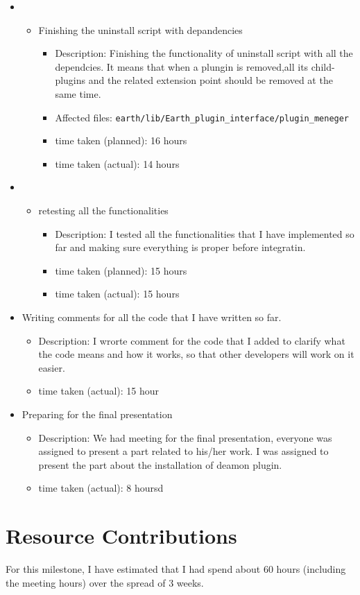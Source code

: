 \documentclass{article}
\begin{document}
\begin{itemize}
	\item  
	     \begin{itemize}
	        \item Finishing the uninstall script with depandencies
	           \begin{itemize}
					\item Description: Finishing the functionality of uninstall script with all the dependcies. It means that when a plungin is     removed,all its child-plugins and the related extension point should be removed at the same time.
				
					\item Affected files: \texttt{earth/lib/Earth\_plugin\_interface/plugin\_meneger}
					\item  time taken (planned): 16 hours
					\item  time taken (actual): 14 hours
				\end{itemize}
			
	     \end{itemize}
	\item 
	     \begin{itemize}
	         \item retesting all the functionalities
	            \begin{itemize}
	              \item Description: I tested all the functionalities that I have implemented so far and making sure everything is proper before integratin. 
					\item time taken (planned): 15 hours
					\item time taken (actual): 15 hours
				 \end{itemize}
	     \end{itemize}
	\item Writing comments for all the code that I have written so far.
	     \begin{itemize}
	         \item Description: I wrorte comment for the code that I added to clarify what the code means and how it works, so that other developers will work on it easier.
	        
	         \item time taken (actual): 15 hour
	     \end{itemize}
	\item Preparing for the final presentation
	     \begin{itemize}
	         \item Description: We had meeting for the final presentation, everyone was assigned to present a part related to his/her work. I was assigned to present the part about the installation of deamon plugin.
	       
	         \item time taken (actual): 8 hoursd
	     \end{itemize}

\end{itemize}

\section*{Resource Contributions}

For this milestone, I have estimated that I had spend about 60 hours (including the meeting hours) over the spread of 3 weeks. 
\end{document}
